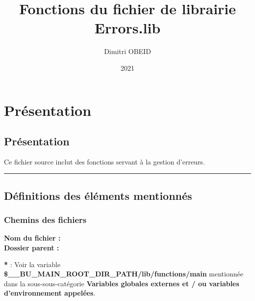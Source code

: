 \documentclass[a4paper,10pt]{article}
\title{\color{sec1}Fonctions du fichier de librairie \color{path}Errors.lib}\color{text}
\author{Dimitri OBEID}
\date{2021}
\begin{document}
    \maketitle
    \tableofcontents
    \newpage

    \color{sec1}
    \section{Présentation}\color{text}

    \color{sec2}
    \subsection{Présentation}\color{text}

    \begin{justify}
        Ce fichier source inclut des fonctions servant à la gestion d'erreurs.
    \end{justify}




    \color{sec2}\par\noindent\rule{\textwidth}{0.4pt}\color{text}

    \color{sec2}
    \subsection{Définitions des éléments mentionnés}\color{text}

    \color{sec3}
    \subsubsection{Chemins des fichiers}\color{text}

    \textbf{Nom du fichier : \color{path}}\\[1\baselineskip]

    \textbf{Dossier parent : \color{path}}\\[1\baselineskip]

    \begin{justify}
        \textbf{*} : Voir la variable \textbf{\color{vars}\$\_\_BU\_MAIN\_ROOT\_DIR\_PATH\color{path}/lib/functions/main} mentionnée dans la sous-sous-catégorie \textbf{\color{sec3}Variables globales externes et / ou variables d'environnement appelées}.
    \end{justify}
\end{document}
